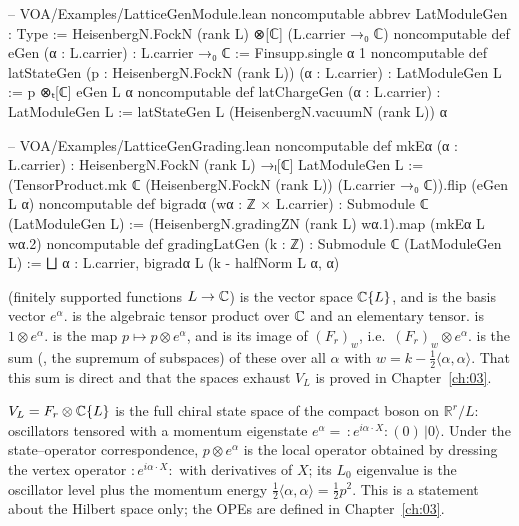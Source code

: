\begin{leancode}
-- VOA/Examples/LatticeGenModule.lean
noncomputable abbrev LatModuleGen : Type :=
  HeisenbergN.FockN (rank L) ⊗[ℂ] (L.carrier →₀ ℂ)
noncomputable def eGen (α : L.carrier) : L.carrier →₀ ℂ := Finsupp.single α 1
noncomputable def latStateGen (p : HeisenbergN.FockN (rank L)) (α : L.carrier) : LatModuleGen L :=
  p ⊗ₜ[ℂ] eGen L α
noncomputable def latChargeGen (α : L.carrier) : LatModuleGen L :=
  latStateGen L (HeisenbergN.vacuumN (rank L)) α

-- VOA/Examples/LatticeGenGrading.lean
noncomputable def mkEα (α : L.carrier) : HeisenbergN.FockN (rank L) →ₗ[ℂ] LatModuleGen L :=
  (TensorProduct.mk ℂ (HeisenbergN.FockN (rank L)) (L.carrier →₀ ℂ)).flip (eGen L α)
noncomputable def bigradα (wα : ℤ × L.carrier) : Submodule ℂ (LatModuleGen L) :=
  (HeisenbergN.gradingZN (rank L) wα.1).map (mkEα L wα.2)
noncomputable def gradingLatGen (k : ℤ) : Submodule ℂ (LatModuleGen L) :=
  ⨆ α : L.carrier, bigradα L (k - halfNorm L α, α)
\end{leancode}

\begin{dictionary}
 (finitely supported functions $L\to{\mathbb{C}}$) is the vector space ${\mathbb{C}}\{L\}$, and
 is the basis vector $e^\alpha$.  is the algebraic tensor product over
${\mathbb{C}}$ and  an elementary tensor.  is $1\otimes e^\alpha$.
 is the map $p\mapsto p\otimes e^\alpha$, and  is its image of
$(F_r)_w$, i.e.\ $(F_r)_w\otimes e^\alpha$.  is the sum (, the
supremum of subspaces) of these over all $\alpha$ with $w=k-\tfrac12\langle\alpha,\alpha\rangle$. That
this sum is direct and that the spaces exhaust $V_L$ is proved in Chapter~\ref{ch:03}.
\end{dictionary}

\begin{physics}
$V_L=F_r\otimes{\mathbb{C}}\{L\}$ is the full chiral state space of the compact boson on $\mathbb R^r/L$: oscillators tensored with a momentum eigenstate $e^\alpha=\,:\!e^{i\alpha\cdot X}\!:(0)\,|0\rangle$. Under the state--operator correspondence, $p\otimes e^\alpha$ is the local operator obtained by dressing the vertex operator $:\!e^{i\alpha\cdot X}\!:$ with derivatives of $X$; its $L_0$ eigenvalue is the oscillator level plus the momentum energy $\tfrac12\langle\alpha,\alpha\rangle=\tfrac12 p^2$. This is a statement about the Hilbert space only; the OPEs are defined in Chapter~\ref{ch:03}.
\end{physics}

